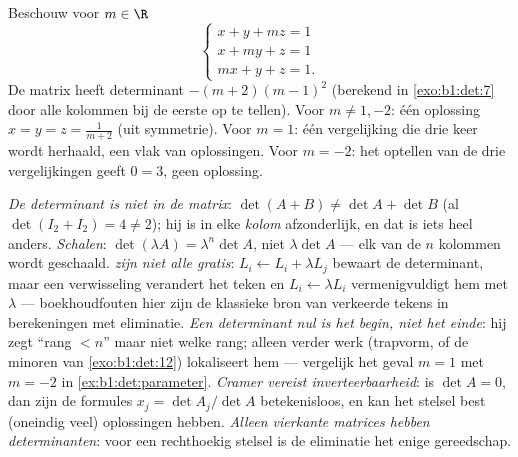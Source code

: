\begin{example}\label{ex:b1:det:parameter}
Beschouw voor $m \in \R$
\[
\begin{cases}
x + y + mz = 1\\
x + my + z = 1\\
mx + y + z = 1 .
\end{cases}
\]
De matrix heeft determinant $-(m+2)(m-1)^2$ (berekend in
\cref{exo:b1:det:7} door alle kolommen bij de eerste op te tellen).
Voor $m \neq 1, -2$: één oplossing $x = y = z = \frac{1}{m+2}$
(uit symmetrie). Voor $m = 1$: één vergelijking die drie keer wordt
herhaald, een vlak van oplossingen. Voor $m = -2$: het optellen van
de drie vergelijkingen geeft $0 = 3$, geen oplossing.
\end{example}

\begin{remark}
\label{rem:b1:det:pitfalls}
\emph{De determinant is niet  in de matrix}: $\det(A + B)
\neq \det A + \det B$ (al $\det(I_2 + I_2) = 4 \neq 2$); hij is
 in elke \emph{kolom} afzonderlijk, en dat is iets heel
anders.
\emph{Schalen}: $\det(\lambda A) = \lambda^n\det A$, niet
$\lambda\det A$ --- elk van de $n$ kolommen wordt geschaald.
\emph{ zijn niet alle gratis}: $L_i \leftarrow L_i +
\lambda L_j$ bewaart de determinant, maar een verwisseling
verandert het teken en $L_i \leftarrow \lambda L_i$
vermenigvuldigt hem met $\lambda$ --- boekhoudfouten hier zijn de
klassieke bron van verkeerde tekens in berekeningen met
eliminatie.
\emph{Een determinant nul is het begin, niet het einde}: hij zegt
``rang $< n$'' maar niet welke rang; alleen verder werk (trapvorm,
of de minoren van \cref{exo:b1:det:12}) lokaliseert hem ---
vergelijk het geval $m = 1$ met $m = -2$ in
\cref{ex:b1:det:parameter}.
\emph{Cramer vereist inverteerbaarheid}: is $\det A = 0$, dan zijn
de formules $x_j = \det A_j/\det A$ betekenisloos, en kan het
stelsel best (oneindig veel) oplossingen hebben.
\emph{Alleen vierkante matrices hebben determinanten}: voor een
rechthoekig stelsel is de eliminatie het enige gereedschap.
\end{remark}

